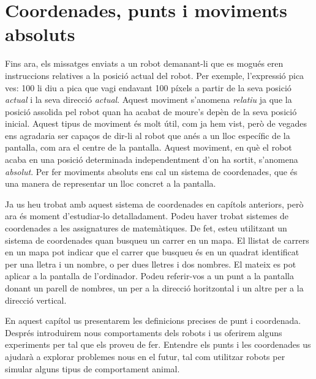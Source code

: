 \chapter{Coordenades, punts i moviments absoluts}
\label{cap21}

Fins ara, els missatges enviats a un robot demanant-li que es mogués eren instruccions relatives a la posició actual del robot. Per exemple, l'expressió \textsf{pica ves: 100} li diu a pica que vagi endavant 100 píxels a partir de la seva posició \emph{actual} i la seva direcció \emph{actual}. Aquest moviment s'anomena \emph{relatiu} ja que la posició assolida pel robot quan ha acabat de moure's depèn de la seva posició inicial. Aquest tipus de moviment és molt útil, com ja hem vist, però de vegades ens agradaria ser capaços de dir-li al robot que anés a un lloc específic de la pantalla, com ara el centre de la pantalla. Aquest moviment, en què el robot acaba en una posició determinada independentment d'on ha sortit, s'anomena \emph{absolut}. Per fer moviments absoluts ens cal un sistema de coordenades, que és una manera de representar un lloc concret a la pantalla.

Ja us heu trobat amb aquest sistema de coordenades en capítols anteriors, però ara és moment d'estudiar-lo detalladament. Podeu haver trobat sistemes de coordenades a les assignatures de matemàtiques. De fet, esteu utilitzant un sistema de coordenades quan busqueu un carrer en un mapa. El llistat de carrers en un mapa pot indicar que el carrer que busqueu és en un quadrat identificat per una lletra i un nombre, o per dues lletres i dos nombres. El mateix es pot aplicar a la pantalla de l'ordinador. Podeu referir-vos a un punt a la pantalla donant un parell de nombres, un per a la direcció horitzontal i un altre per a la direcció vertical.

En aquest capítol us presentarem les definicions precises de punt i coordenada. Després introduirem nous comportaments dels robots i us oferirem alguns experiments per tal que els proveu de fer. Entendre els punts i les coordenades us ajudarà a explorar problemes nous en el futur, tal com utilitzar robots per simular alguns tipus de comportament animal.

